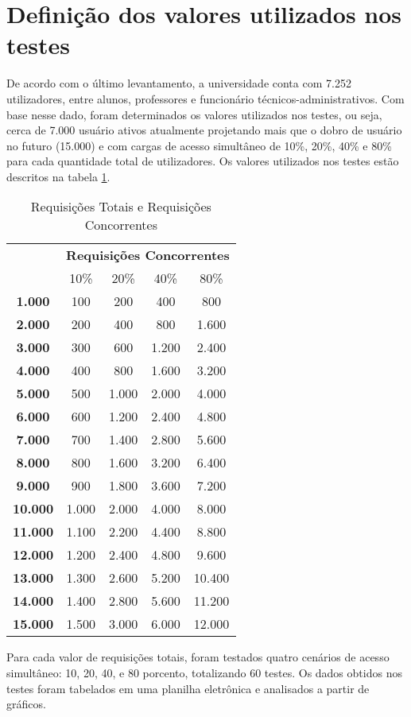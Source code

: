\section{Definição dos valores utilizados nos testes}
De acordo com o último levantamento, a universidade conta com 7.252 
utilizadores, entre alunos, professores e funcionário técnicos-administrativos.
Com base nesse dado, foram determinados os valores utilizados nos testes, ou 
seja, cerca de 7.000 usuário ativos atualmente projetando mais que o dobro de 
usuário no futuro (15.000) e com cargas de acesso simultâneo de 10\%, 20\%, 
40\% e 80\% para cada quantidade total de utilizadores. Os valores utilizados 
nos testes estão descritos na tabela \ref{tab:requisicoes}.
\begin{table}[htb]
	\centering
\ABNTEXfontereduzida
\caption[Requisições Totais e Requisições Concorrentes]{Requisições Totais e Requisições Concorrentes}
\label{tab:requisicoes}
\begin{tabular}{|>{\bfseries}c|c|c|c|c|}
\hline
\multirow{2}{*}{Requisições Totais} & \multicolumn{4}{c|}{\textbf{Requisições 
Concorrentes}} \\ \cline{2-5}
& 10\%      & 20\%  & 40\%  & 80\%  \\ \hline
1.000  & 100   & 200   & 400   & 800   \\ \hline
2.000  & 200   & 400   & 800   & 1.600  \\ \hline
3.000  & 300   & 600   & 1.200 & 2.400  \\ \hline
4.000  & 400   & 800   & 1.600 & 3.200  \\ \hline
5.000  & 500   & 1.000 & 2.000 & 4.000  \\ \hline
6.000  & 600   & 1.200 & 2.400 & 4.800  \\ \hline
7.000  & 700   & 1.400 & 2.800 & 5.600  \\ \hline
8.000  & 800   & 1.600 & 3.200 & 6.400  \\ \hline
9.000  & 900   & 1.800 & 3.600 & 7.200  \\ \hline
10.000 & 1.000 & 2.000 & 4.000 & 8.000  \\ \hline
11.000 & 1.100 & 2.200 & 4.400 & 8.800  \\ \hline
12.000 & 1.200 & 2.400 & 4.800 & 9.600  \\ \hline
13.000 & 1.300 & 2.600 & 5.200 & 10.400 \\ \hline
14.000 & 1.400 & 2.800 & 5.600 & 11.200 \\ \hline
15.000 & 1.500 & 3.000 & 6.000 & 12.000 \\ \hline
\end{tabular}
\end{table}
Para cada valor de requisições totais, foram testados quatro cenários de acesso 
simultâneo: 10, 20, 40, e 80 porcento, totalizando 60 testes. Os dados obtidos 
nos testes foram tabelados em uma planilha eletrônica e analisados a partir de 
gráficos.

